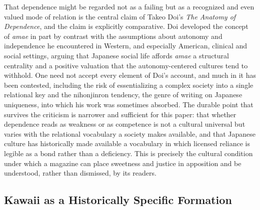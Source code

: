 \documentclass[11pt,a4paper]{article}
\begin{document}
That dependence might be regarded not as a failing but as a recognized and even valued mode of relation is the central claim of Takeo Doi's \textit{The Anatomy of Dependence}, and the claim is explicitly comparative. Doi developed the concept of \textit{amae} in part by contrast with the assumptions about autonomy and independence he encountered in Western, and especially American, clinical and social settings, arguing that Japanese social life affords \textit{amae} a structural centrality and a positive valuation that the autonomy-centered cultures tend to withhold. One need not accept every element of Doi's account, and much in it has been contested, including the risk of essentializing a complex society into a single relational key and the nihonjinron tendency, the genre of writing on Japanese uniqueness, into which his work was sometimes absorbed. The durable point that survives the criticism is narrower and sufficient for this paper: that whether dependence reads as weakness or as competence is not a cultural universal but varies with the relational vocabulary a society makes available, and that Japanese culture has historically made available a vocabulary in which licensed reliance is legible as a bond rather than a deficiency. This is precisely the cultural condition under which a magazine can place sweetness and justice in apposition and be understood, rather than dismissed, by its readers.

\subsection{Kawaii as a Historically Specific Formation}
\end{document}
